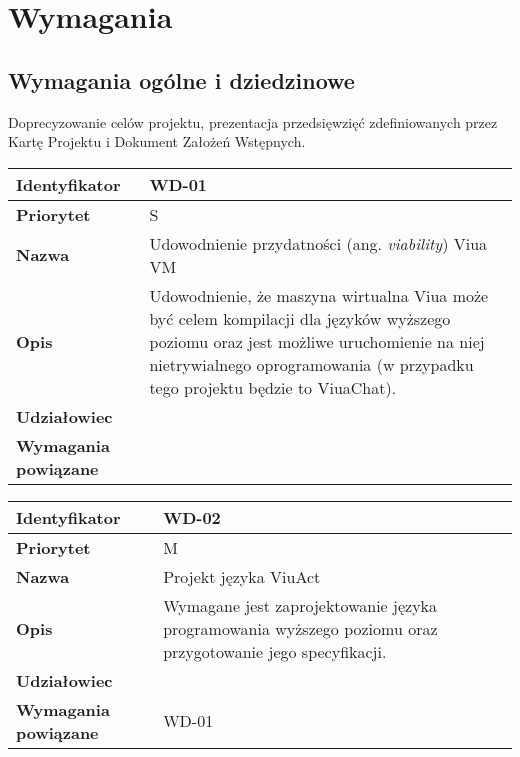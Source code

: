 \newpage
\section{Wymagania}

\subsection{Wymagania ogólne i dziedzinowe}

Doprecyzowanie celów projektu, prezentacja przedsięwzięć zdefiniowanych przez Kartę Projektu i
Dokument Założeń Wstępnych.

\vspace{1em}

\begin{tabular}{ | l | l | }
    \hline
    \textbf{Identyfikator} & \parbox[t]{11cm}{WD-01} \\
    \hline
    \textbf{Priorytet} & S \\
    \hline
    \textbf{Nazwa} & Udowodnienie przydatności (ang. \emph{viability}) Viua VM \\
    \hline
    \textbf{Opis} & \parbox[t]{11cm}{
        Udowodnienie, że maszyna wirtualna Viua może być celem kompilacji dla
        języków wyższego poziomu oraz jest możliwe uruchomienie na niej nietrywialnego
        oprogramowania (w przypadku tego projektu będzie to ViuaChat).} \\
    \hline
    \textbf{Udziałowiec} & \phantom{} \\
    \hline
    \textbf{Wymagania powiązane} & \phantom{} \\
    \hline
\end{tabular}

\vspace{1em}

\begin{tabular}{ | l | l | }
    \hline
    \textbf{Identyfikator} & \parbox[t]{11cm}{WD-02} \\
    \hline
    \textbf{Priorytet} & M \\
    \hline
    \textbf{Nazwa} & Projekt języka ViuAct \\
    \hline
    \textbf{Opis} & \parbox[t]{11cm}{
        Wymagane jest zaprojektowanie języka programowania wyższego poziomu oraz przygotowanie
        jego specyfikacji.
    } \\
    \hline
    \textbf{Udziałowiec} & \phantom{} \\
    \hline
    \textbf{Wymagania powiązane} & WD-01 \\
    \hline
\end{tabular}

